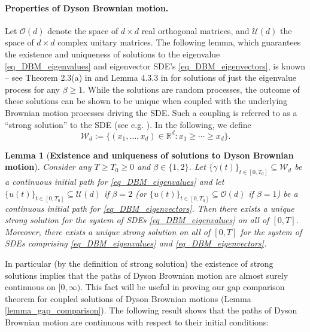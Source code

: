 \documentclass[11pt,letterpaper]{article}
\newtheorem{lemma}[theorem]{Lemma}
\begin{document}
\paragraph{Properties of Dyson Brownian motion.}
Let $\mathcal{O}(d)$ denote the space of $d \times d$ real orthogonal matrices, and $\mathcal{U}(d)$ the space of $d \times d$ complex unitary matrices. 
%
The following lemma, which guarantees the existence and uniqueness of solutions to the eigenvalue \eqref{eq_DBM_eigenvalues} and eigenvector SDE's \eqref{eq_DBM_eigenvectors}, is known -- see Theorem 2.3(a) in \cite{bourgade2017eigenvector} and Lemma 4.3.3 in \cite{anderson2010introduction} for solutions of just the eigenvalue process for any $\beta \geq 1$.
%
While the solutions are random processes, the outcome of these solutions can be shown to be unique when coupled with the underlying Brownian motion processes driving the SDE.
%
Such a coupling is referred to as a ``strong solution'' to the SDE (see e.g. \cite{lawler2010stochastic}).
%
%
 In the following, we define
 \begin{equation}\label{eq:WeylChamber}
 \mathcal{W}_d := \{(x_1, \ldots, x_d) \in \mathbb{R}^d:  x_1 \geq \cdots \geq x_d\}.
 \end{equation}
%
\begin{lemma}[\bf Existence and uniqueness of solutions to Dyson Brownian motion] \label{lemma_strong}
Consider any $T \geq T_0 \geq 0$ and $\beta \in \{1,2\}$.
%
%
Let $\{\gamma(t)\}_{t \in [0,T_0]} \subseteq \mathcal{W}_d$ be a continuous initial path for \eqref{eq_DBM_eigenvalues} and let $\{u(t)\}_{t \in [0,T_0]} \subseteq \mathcal{U}(d)$ if $\beta=2$ (or  $\{u(t)\}_{t \in [0,T_0]} \subseteq \mathcal{O}(d)$  if $\beta =1$) be a continuous initial path for \eqref{eq_DBM_eigenvectors}.
%
Then there exists a unique strong solution for the system of SDEs \eqref{eq_DBM_eigenvalues} on all of $[0,T]$.
%
Moreover, there exists a unique strong solution on all of $[0,T]$ for the system of SDEs comprising \eqref{eq_DBM_eigenvalues} and \eqref{eq_DBM_eigenvectors}.

\end{lemma}
\noindent
In particular (by the definition of strong solution) the existence of strong solutions implies that the paths of Dyson Brownian motion are almost surely continuous on $[0,\infty)$.
%
This fact will be useful in proving our gap comparison theorem for coupled solutions of Dyson Brownian motions (Lemma \ref{lemma_gap_comparison}).
%
The following result shows that the paths of Dyson Brownian motion are continuous with respect to their initial conditions:
\end{document}
